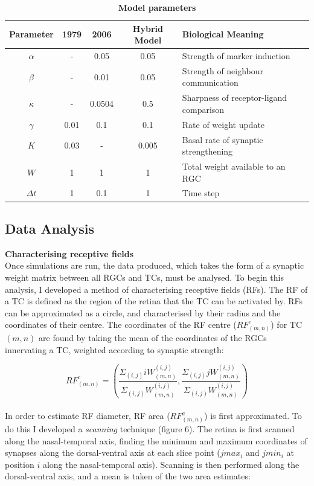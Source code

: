 \documentclass[11pt]{"article"}
\begin{document}
\pagebreak
\begin{table}[h]
\caption{\textbf{Model parameters}}
\begin{tabular}{|c|c|c|c|l|}
\hline Parameter & 1979 & 2006 & Hybrid Model & Biological Meaning \\ \hline
$\alpha$ & - & 0.05 & 0.05 & Strength of marker induction  \\
$\beta$ & - & 0.01 & 0.05 & Strength of neighbour communication \\
$\kappa$ & - & 0.0504 & 0.5 & Sharpness of receptor-ligand comparison  \\
$\gamma$ & 0.01 & 0.1 & 0.1 & Rate of weight update \\
$K$ & 0.03 & - & 0.005 & Basal rate of synaptic strengthening \\
$W$ & 1 & 1 & 1 & Total weight available to an RGC \\
$\Delta t$ & 1 & 0.1 & 1 & Time step \\ \hline
\end{tabular}
\end{table}
\pagebreak

\subsection{Data Analysis}

\textbf{Characterising receptive fields}\\
Once simulations are run, the data produced, which takes the form of a synaptic weight matrix between all RGCs and TCs, must be analysed. To begin this analysis, I developed a method of characterising receptive fields (RFs). The RF of a TC is defined as the region of the retina that the TC can be activated by. RFs can be approximated as a circle, and characterised by their radius and the coordinates of their centre. The coordinates of the RF centre ($RF^c_{(m,n)}$) for TC $(m,n)$ are found by taking the mean of the coordinates of the RGCs innervating a TC, weighted according to synaptic strength:

\begin{equation}
RF^c_{(m,n)} = \left( \frac{\Sigma_{(i,j)} i W^{(i,j)}_{(m,n)}}{\Sigma_{(i,j)} W^{(i,j)}_{(m,n)}} , \frac{\Sigma_{(i,j)} j W^{(i,j)}_{(m,n)}}{\Sigma_{(i,j)} W^{(i,j)}_{(m,n)}} \right)
\end{equation}\\

In order to estimate RF diameter, RF area ($RF^a_{(m,n)}$) is first approximated. To do this I developed a \textit{scanning} technique (figure 6). The retina is first scanned along the nasal-temporal axis, finding the minimum and maximum coordinates of synapses along the dorsal-ventral axis at each slice point ($jmax_i$ and $jmin_i$ at position $i$ along the nasal-temporal axis). Scanning is then performed along the dorsal-ventral axis, and a mean is taken of the two area estimates: 
\end{document}
